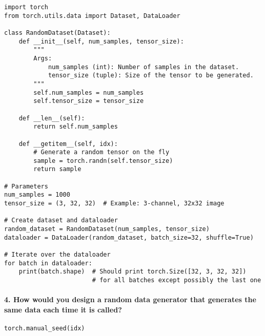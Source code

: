 \begin{verbatim}
import torch
from torch.utils.data import Dataset, DataLoader

class RandomDataset(Dataset):
    def __init__(self, num_samples, tensor_size):
        """
        Args:
            num_samples (int): Number of samples in the dataset.
            tensor_size (tuple): Size of the tensor to be generated.
        """
        self.num_samples = num_samples
        self.tensor_size = tensor_size

    def __len__(self):
        return self.num_samples

    def __getitem__(self, idx):
        # Generate a random tensor on the fly
        sample = torch.randn(self.tensor_size)
        return sample

# Parameters
num_samples = 1000
tensor_size = (3, 32, 32)  # Example: 3-channel, 32x32 image

# Create dataset and dataloader
random_dataset = RandomDataset(num_samples, tensor_size)
dataloader = DataLoader(random_dataset, batch_size=32, shuffle=True)

# Iterate over the dataloader
for batch in dataloader:
    print(batch.shape)  # Should print torch.Size([32, 3, 32, 32]) 
                        # for all batches except possibly the last one
\end{verbatim}

\paragraph{4. How would you design a random data generator that generates the same data each time it is called?}

\begin{verbatim}
torch.manual_seed(idx)
\end{verbatim}




